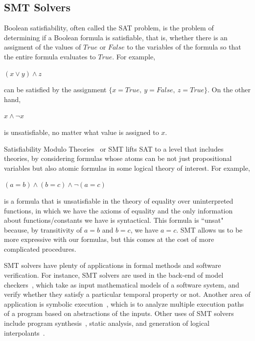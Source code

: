 \documentclass{article}
\begin{document}
	\subsection{SMT Solvers}
	\label{smt}
		Boolean satisfiability, often called the SAT 
		problem, is the problem of determining if a 
		Boolean formula	is satisfiable, that is, 
		whether there is an assigment of the values 
		of $True$ or $False$ to the variables of the 
		formula so that the entire formula evaluates 
		to $True$. For example,
			\begin{center}
				$(x \lor y) \land z$ 
			\end{center}
		can be satisfied by the 
		assignment $\{x=True,\ y=False,\ z=True\}$. On 
		the other hand, 
			\begin{center} 
				$x \land \neg x$ 
			\end{center}
		is unsatisfiable, no matter what value is 
		assigned to $x$.
	
		Satisfiability Modulo Theories~\cite{DBLP:reference/mc/BarrettT18} 
		or SMT lifts SAT to a level that includes 
		theories, by considering formulas whose atoms 
		can be not just propositional variables but 
		also atomic formulas in some logical theory 
		of interest.
		For example, 
			\begin{center} 
				$(a = b) \land (b = c) \land \neg (a = c)$ 
			\end{center}
		is a formula that is unsatisfiable in the 
		theory of equality over uninterpreted functions, 
		in which we have the axioms of equality and the 
		only information about functions/constants we 
		have is syntactical. 
		This formula is ``unsat" because, by	
		transitivity of $a = b$ and $b = c$, we have 
		$a = c$. SMT allows us to be more expressive with 
		our formulas, but this comes at the cost of more complicated procedures.
	
		SMT solvers have plenty of applications in 
		formal methods and software verification. 
		For instance, SMT solvers are used in the 
		back-end of model
		checkers~\cite{DBLP:books/daglib/0020348}, 
		which take as input mathematical models of a 
		software system, and verify whether they satisfy 
		a particular temporal property or not. Another 
		area of application is symbolic
		execution~\cite{DBLP:journals/csur/BaldoniCDDF18}, 
		which is to analyze multiple execution paths 
		of a program based on abstractions of the 
		inputs. Other uses of SMT solvers include 
		program synthesis~\cite{synth}, static analysis, 
		and generation of logical
		interpolants~\cite{DBLP:journals/corr/abs-1111-5652}.
	
\end{document}
